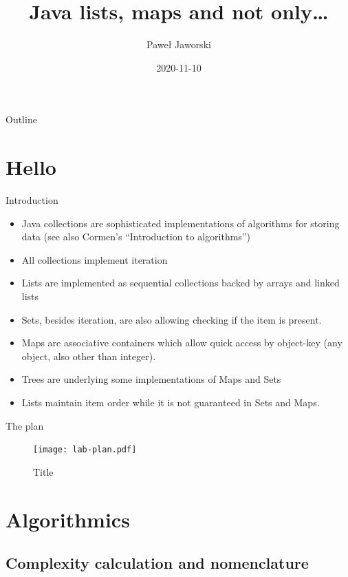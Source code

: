 \documentclass{beamer}
\title[Java lists, maps and not only]{Java lists, maps and not only\ldots}
\author{Paweł Jaworski}
\institute{Luxoft/Akademia Górniczo Hutnicza}
\date{2020-11-10}
\begin{document}
\begin{frame}
  \titlepage
\end{frame}

\begin{frame}{Outline}
  \tableofcontents
\end{frame}

\section{Hello}

\begin{frame}{Introduction}

\begin{itemize}
  \item Java collections are sophisticated implementations of algorithms for storing data (see also Cormen's ``Introduction to algorithms'')
  \item All collections implement iteration
  \item Lists are implemented as sequential collections backed by arrays and linked lists
  \item Sets, besides iteration, are also allowing checking if the item is present.
  \item Maps are associative containers which allow quick access by object-key (any object, also other than integer).
  \item Trees are underlying some implementations of Maps and Sets
  \item Lists maintain item order while it is not guaranteed in Sets and Maps.
\end{itemize}

\end{frame}

\begin{frame}{The plan}
    \begin{figure}[htbp]
    \centering
        \texttt{[image: lab-plan.pdf]}
    \caption{Title}
    \label{fig:lab-plan}
    \end{figure}

\end{frame}

\section{Algorithmics}

\subsection{Complexity calculation and nomenclature}
\end{document}
